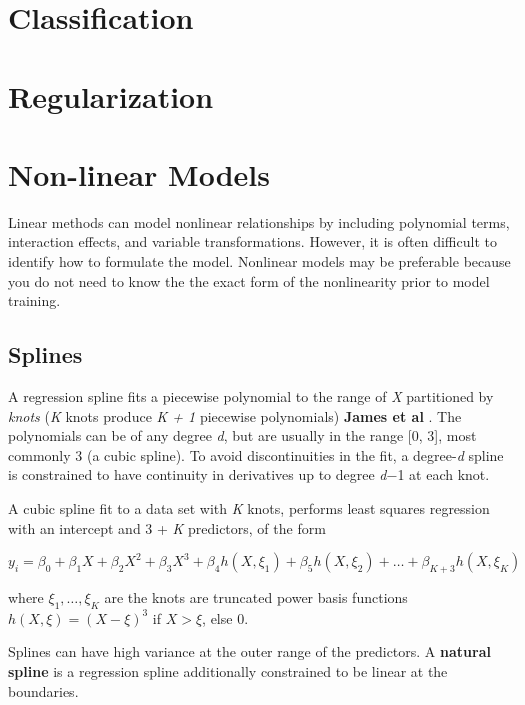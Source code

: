\documentclass[
]{book}
\begin{document}
\hypertarget{classification}{%
\chapter{Classification}\label{classification}}

\hypertarget{regularization}{%
\chapter{Regularization}\label{regularization}}

\hypertarget{non-linear-models}{%
\chapter{Non-linear Models}\label{non-linear-models}}

Linear methods can model nonlinear relationships by including polynomial terms, interaction effects, and variable transformations. However, it is often difficult to identify how to formulate the model. Nonlinear models may be preferable because you do not need to know the the exact form of the nonlinearity prior to model training.

\hypertarget{splines}{%
\section{Splines}\label{splines}}

A regression spline fits a piecewise polynomial to the range of \emph{X} partitioned by \emph{knots} (\emph{K} knots produce \emph{K + 1} piecewise polynomials) \textbf{James et al} \citep{James2013}. The polynomials can be of any degree \emph{d}, but are usually in the range {[}0, 3{]}, most commonly 3 (a cubic spline). To avoid discontinuities in the fit, a degree-\emph{d} spline is constrained to have continuity in derivatives up to degree \emph{d}−1 at each knot.

A cubic spline fit to a data set with \emph{K} knots, performs least squares regression with an intercept and 3 + \emph{K} predictors, of the form

\[y_i = \beta_0 + \beta_1X + \beta_2X^2 + \beta_3X^3 + \beta_4h(X, \xi_1) + \beta_5h(X, \xi_2) + \dots + \beta_{K+3}h(X, \xi_K)\]

where \(\xi_1, \dots, \xi_K\) are the knots are truncated power basis functions \(h(X, \xi) = (X - \xi)^3\) if \(X > \xi\), else 0.

Splines can have high variance at the outer range of the predictors. A \textbf{natural spline} is a regression spline additionally constrained to be linear at the boundaries.
\end{document}
